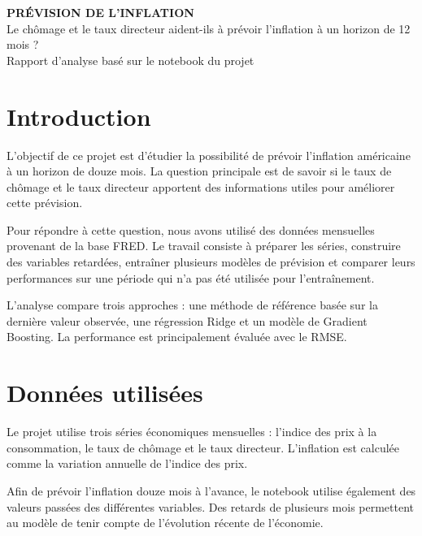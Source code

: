 \documentclass[12pt,a4paper]{article}
\begin{document}
\begin{center}
    {\Huge\bfseries\color{bleu} PRÉVISION DE L'INFLATION}\\[1em]
    {\Large Le chômage et le taux directeur aident-ils à prévoir l'inflation à un horizon de 12 mois ?}\\[1em]
    {\large Rapport d'analyse basé sur le notebook du projet}
\end{center}

\vspace{1cm}

\section{Introduction}

L'objectif de ce projet est d'étudier la possibilité de prévoir l'inflation américaine à un horizon de douze mois. La question principale est de savoir si le taux de chômage et le taux directeur apportent des informations utiles pour améliorer cette prévision.

Pour répondre à cette question, nous avons utilisé des données mensuelles provenant de la base FRED. Le travail consiste à préparer les séries, construire des variables retardées, entraîner plusieurs modèles de prévision et comparer leurs performances sur une période qui n'a pas été utilisée pour l'entraînement.

L'analyse compare trois approches : une méthode de référence basée sur la dernière valeur observée, une régression Ridge et un modèle de Gradient Boosting. La performance est principalement évaluée avec le RMSE.

\section{Données utilisées}

Le projet utilise trois séries économiques mensuelles : l'indice des prix à la consommation, le taux de chômage et le taux directeur. L'inflation est calculée comme la variation annuelle de l'indice des prix.

Afin de prévoir l'inflation douze mois à l'avance, le notebook utilise également des valeurs passées des différentes variables. Des retards de plusieurs mois permettent au modèle de tenir compte de l'évolution récente de l'économie.

\end{document}
